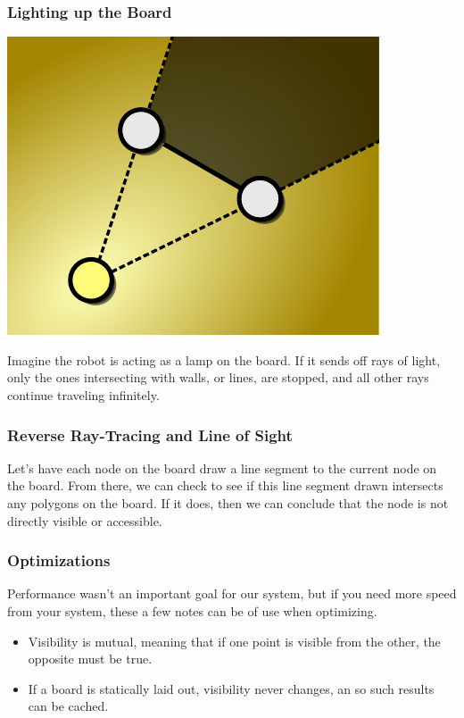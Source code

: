 \documentclass[letterpaper, 12pt]{article}
\begin{document}
\begin{multicols}{2}
\subsubsection{Lighting up the Board}

\includegraphics[width=\columnwidth]{img/light.pdf}

Imagine the robot is acting as a lamp on the board. If it sends off rays of
light, only the ones intersecting with walls, or lines, are stopped, and all
other rays continue traveling infinitely.

\subsubsection{Reverse Ray-Tracing and Line of Sight}

Let's have each node on the board draw a line segment to the current node on the
board. From there, we can check to see if this line segment drawn intersects any
polygons on the board. If it does, then we can conclude that the node is not
directly visible or accessible.

\subsubsection{Optimizations}

Performance wasn't an important goal for our system, but if you need more speed
from your system, these a few notes can be of use when optimizing.

\begin{itemize}
    \item Visibility is mutual, meaning that if one point is visible from the
          other, the opposite must be true.
    \item If a board is statically laid out, visibility never changes, an so
          such results can be cached.
\end{itemize}


\end{multicols}
\end{document}
